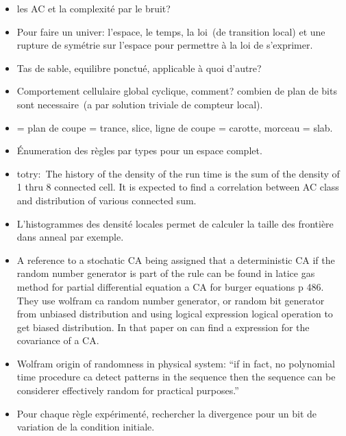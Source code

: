 \begin{itemize}
\item les AC et la complexit\'e par le bruit? %

\item Pour faire un univer: l'espace, le temps, la loi~(de transition
  local) et une rupture de sym\'etrie sur l'espace pour permettre \`a la
  loi de s'exprimer. %

\item Tas de sable, equilibre ponctu\'e, applicable \`a quoi d'autre?

\item Comportement cellulaire global cyclique, comment?  combien de
  plan de bits sont necessaire~(a par solution triviale de compteur local). %

\item = plan de coupe = trance, slice, ligne de coupe = carotte,
  morceau = slab. %

\item \'Enumeration des r\`egles par types pour un espace complet. %

\item totry:~The history of the density of the run time is the sum of the
  density of 1 thru 8 connected cell. %
  It is expected to find a correlation between AC class and distribution
  of various connected sum. %

\item L'histogrammes des densit\'e locales permet de calculer la taille des
  fronti\`ere dans anneal par exemple. %

\item A reference to a stochatic CA being assigned that a
  deterministic CA if the random number generator is part of the rule
  can be found in latice gas method for partial differential equation
  a CA for burger equations p 486. %
  They use wolfram ca random number generator, or random bit generator
  from unbiased distribution and using logical expression logical
  operation to get biased distribution. %
  In that paper on can find a expression for the covariance of a CA.

\item Wolfram origin of randomness in physical system: ``if in fact, no
  polynomial time procedure ca detect patterns in the sequence then the
  sequence can be considerer effectively random for practical purposes.''

\item Pour chaque r\`egle exp\'eriment\'e, rechercher la divergence pour un bit de
  variation de la condition initiale.


\end{itemize}
